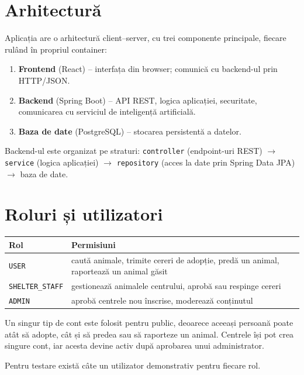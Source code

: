 \documentclass[11pt,a4paper]{article}
\begin{document}
\section{Arhitectură}

Aplicația are o arhitectură client--server, cu trei componente principale, fiecare
rulând în propriul container:

\begin{enumerate}
  \item \textbf{Frontend} (React) -- interfața din browser; comunică cu backend-ul prin HTTP/JSON.
  \item \textbf{Backend} (Spring Boot) -- API REST, logica aplicației, securitate,
        comunicarea cu serviciul de inteligență artificială.
  \item \textbf{Baza de date} (PostgreSQL) -- stocarea persistentă a datelor.
\end{enumerate}

Backend-ul este organizat pe straturi:
\texttt{controller} (endpoint-uri REST) $\rightarrow$ \texttt{service} (logica aplicației)
$\rightarrow$ \texttt{repository} (acces la date prin Spring Data JPA) $\rightarrow$ baza de date.

\section{Roluri și utilizatori}

\begin{center}
\begin{tabularx}{\textwidth}{@{}lX@{}}
\toprule
\textbf{Rol} & \textbf{Permisiuni} \\
\midrule
\texttt{USER}          & caută animale, trimite cereri de adopție, predă un animal,
                         raportează un animal găsit \\
\texttt{SHELTER\_STAFF} & gestionează animalele centrului, aprobă sau respinge cereri \\
\texttt{ADMIN}         & aprobă centrele nou înscrise, moderează conținutul \\
\bottomrule
\end{tabularx}
\end{center}

Un singur tip de cont este folosit pentru public, deoarece aceeași persoană poate
atât să adopte, cât și să predea sau să raporteze un animal. Centrele își pot crea
singure cont, iar acesta devine activ după aprobarea unui administrator.

Pentru testare există câte un utilizator demonstrativ pentru fiecare rol.
\end{document}
